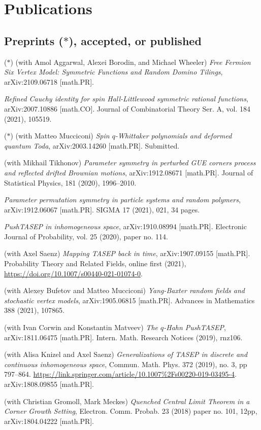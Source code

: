 \documentclass[letterpaper,11pt]{article}
\begin{document}
\section*{Publications}

\subsection*{Preprints ($*$), accepted, or published}

\begin{etaremune}
	\renewcommand{\labelenumi}{[\theenumi]}
	\item ($*$)
		(with Amol Aggarwal, Alexei Borodin, and Michael Wheeler)
		\emph{Free Fermion Six Vertex Model: Symmetric Functions and Random Domino Tilings},
		arXiv:2109.06718 [math.PR].
	\item 
		\emph{Refined Cauchy identity for spin Hall-Littlewood symmetric rational functions},
		arXiv:2007.10886 [math.CO].
		Journal of Combinatorial Theory Ser. A, vol. 184 (2021), 105519.
	\item ($*$)
		(with Matteo Mucciconi)
		\emph{Spin $q$-Whittaker polynomials and deformed quantum Toda},
		arXiv:2003.14260 [math.PR]. Submitted.
	\item
		(with Mikhail Tikhonov)
		\emph{Parameter symmetry in perturbed GUE corners process and reflected drifted Brownian motions},
		arXiv:1912.08671 [math.PR]. Journal of Statistical Physics, 181 (2020), 1996–2010.
	\item 
		\emph{Parameter permutation symmetry in particle systems and random polymers},
		arXiv:1912.06067 [math.PR]. SIGMA 17 (2021), 021, 34 pages.
	\item 
		\emph{PushTASEP in inhomogeneous space},
		arXiv:1910.08994 [math.PR]. Electronic Journal of Probability, vol. 25 (2020), paper no. 114.
	\item 
		(with Axel Saenz)
		\emph{Mapping TASEP back in time},
		arXiv:1907.09155 [math.PR]. 
		Probability Theory and Related Fields, online first (2021), \url{https://doi.org/10.1007/s00440-021-01074-0}.
\item 
	(with Alexey Bufetov and Matteo Mucciconi)
	\emph{Yang-Baxter random fields and stochastic vertex models},
	arXiv:1905.06815 [math.PR]. Advances in Mathematics 388 (2021), 107865.
\item 
	(with Ivan Corwin and Konstantin Matveev)
	\emph{The $q$-Hahn PushTASEP},
	arXiv:1811.06475 [math.PR]. Intern. Math. Research Notices (2019), rnz106.
\item 
	(with Alisa Knizel and
		Axel Saenz)
		\emph{Generalizations of TASEP in discrete and continuous inhomogeneous space},
		Commun. Math. Phys. 
		372 (2019), no. 3, pp 797–864.
		\url{https://link.springer.com/article/10.1007%2Fs00220-019-03495-4}.
		arXiv:1808.09855 [math.PR].
\item (with Christian Gromoll, Mark Meckes)
		\emph{Quenched Central Limit Theorem in a Corner Growth Setting},
		Electron. Comm. Probab. 23 (2018) paper no. 101, 12pp,
		arXiv:1804.04222 [math.PR].
	

\end{etaremune}
\end{document}
